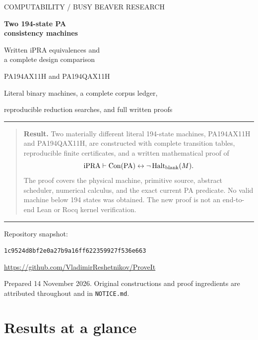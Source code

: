 \documentclass[11pt,a4paper]{article}
\newcommand{\ipra}{\mathrm{iPRA}}
\newcommand{\PA}{\mathrm{PA}}
\newcommand{\Con}{\operatorname{Con}}
\newcommand{\Halt}{\operatorname{Halt}}
\newcommand{\file}[1]{\texttt{\nolinkurl{#1}}}
\begin{document}
\hypersetup{pageanchor=false}
\begin{titlepage}
\thispagestyle{empty}
\setlength{\parindent}{0pt}
\vspace*{12mm}
{\sffamily\color{teal!60!black}\large COMPUTABILITY / BUSY BEAVER RESEARCH\par}
\vspace{9mm}
{\sffamily\bfseries\Huge Two 194-state PA\\[2mm]consistency machines\par}
\vspace{4mm}
{\sffamily\LARGE Written iPRA equivalences and\\a complete design comparison\par}
\vspace{9mm}
{\Large PA194AX11H and PA194QAX11H\par}
\vspace{4mm}
{\large Literal binary machines, a complete corpus ledger,\par
reproducible reduction searches, and full written proofs\par}
\vspace{12mm}
\noindent\rule{\textwidth}{0.6pt}
\begin{quote}
\textbf{Result.} Two materially different literal 194-state machines,
PA194AX11H and PA194QAX11H, are constructed with complete transition tables,
reproducible finite certificates, and a written mathematical proof of
\[
 \ipra\vdash \Con(\PA)\leftrightarrow
                      \neg\Halt_{\rm blank}(M).
\]
The proof covers the physical machine, primitive source, abstract
scheduler, numerical calculus, and the exact current PA predicate.
No valid machine below 194 states was obtained. The new proof is not
an end-to-end Lean or Rocq kernel verification.
\end{quote}
\noindent\rule{\textwidth}{0.6pt}
\vfill
\noindent Repository snapshot:\par
\noindent\texttt{1c9524d8bf2e0a27b9a16ff622359927f536e663}\par
\smallskip
\noindent\url{https://github.com/VladimirReshetnikov/ProveIt}\par
\vspace{5mm}
\noindent Prepared 14 November 2026. Original constructions and proof
ingredients are attributed throughout and in \file{NOTICE.md}.
\end{titlepage}
\hypersetup{pageanchor=true}

\section*{Results at a glance}
\end{document}
